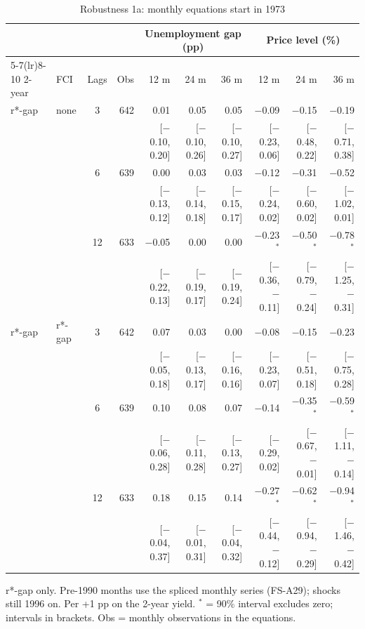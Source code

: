 \begin{table}[p]\centering\footnotesize\setlength{\tabcolsep}{2.2pt}
\caption{Robustness 1a: monthly equations start in 1973}\label{tab:R1a}
\begin{tabular}{llcrrrrrrr}\toprule
 & & & & \multicolumn{3}{c}{Unemployment gap (pp)} & \multicolumn{3}{c}{Price level (\%)}\\ \cmidrule(lr){5-7}\cmidrule(lr){8-10}
2-year & FCI & Lags & Obs & 12 m & 24 m & 36 m & 12 m & 24 m & 36 m\\ \midrule
r*-gap & none & 3 & 642 & 0.01 & 0.05 & 0.05 & $-$0.09 & $-$0.15 & $-$0.19\\
 & & & & {\scriptsize [$-$0.10, 0.20]} & {\scriptsize [$-$0.10, 0.26]} & {\scriptsize [$-$0.10, 0.27]} & {\scriptsize [$-$0.23, 0.06]} & {\scriptsize [$-$0.48, 0.22]} & {\scriptsize [$-$0.71, 0.38]}\\
 &  & 6 & 639 & 0.00 & 0.03 & 0.03 & $-$0.12 & $-$0.31 & $-$0.52\\
 & & & & {\scriptsize [$-$0.13, 0.12]} & {\scriptsize [$-$0.14, 0.18]} & {\scriptsize [$-$0.15, 0.17]} & {\scriptsize [$-$0.24, 0.02]} & {\scriptsize [$-$0.60, 0.02]} & {\scriptsize [$-$1.02, 0.01]}\\
 &  & 12 & 633 & $-$0.05 & 0.00 & 0.00 & $-$0.23$^{*}$ & $-$0.50$^{*}$ & $-$0.78$^{*}$\\
 & & & & {\scriptsize [$-$0.22, 0.13]} & {\scriptsize [$-$0.19, 0.17]} & {\scriptsize [$-$0.19, 0.24]} & {\scriptsize [$-$0.36, $-$0.11]} & {\scriptsize [$-$0.79, $-$0.24]} & {\scriptsize [$-$1.25, $-$0.31]}\\
r*-gap & r*-gap & 3 & 642 & 0.07 & 0.03 & 0.00 & $-$0.08 & $-$0.15 & $-$0.23\\
 & & & & {\scriptsize [$-$0.05, 0.18]} & {\scriptsize [$-$0.13, 0.17]} & {\scriptsize [$-$0.16, 0.16]} & {\scriptsize [$-$0.23, 0.07]} & {\scriptsize [$-$0.51, 0.18]} & {\scriptsize [$-$0.75, 0.28]}\\
 &  & 6 & 639 & 0.10 & 0.08 & 0.07 & $-$0.14 & $-$0.35$^{*}$ & $-$0.59$^{*}$\\
 & & & & {\scriptsize [$-$0.06, 0.28]} & {\scriptsize [$-$0.11, 0.28]} & {\scriptsize [$-$0.13, 0.27]} & {\scriptsize [$-$0.29, 0.02]} & {\scriptsize [$-$0.67, $-$0.01]} & {\scriptsize [$-$1.11, $-$0.14]}\\
 &  & 12 & 633 & 0.18 & 0.15 & 0.14 & $-$0.27$^{*}$ & $-$0.62$^{*}$ & $-$0.94$^{*}$\\
 & & & & {\scriptsize [$-$0.04, 0.37]} & {\scriptsize [$-$0.01, 0.31]} & {\scriptsize [$-$0.04, 0.32]} & {\scriptsize [$-$0.44, $-$0.12]} & {\scriptsize [$-$0.94, $-$0.29]} & {\scriptsize [$-$1.46, $-$0.42]}\\
\bottomrule\end{tabular}
\par\smallskip\parbox{0.96\linewidth}{\scriptsize r*-gap only. Pre-1990 months use the spliced monthly series (FS-A29); shocks still 1996 on. Per +1 pp on the 2-year yield. $^{*}$ = 90\% interval excludes zero; intervals in brackets. Obs = monthly observations in the equations.}
\end{table}
